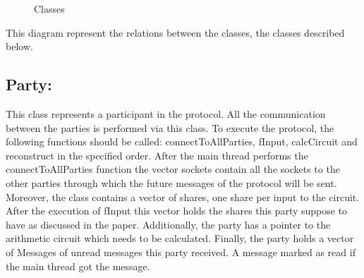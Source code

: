 \documentclass[12pt]{article}
\begin{document}
\begin{figure}[h]
  \caption{Classes}
  \label{fig:Classes}
\end{figure}

This diagram represent the relations between the classes, the classes described below.
\pagebreak
\subsection{Party:}
This class represents a participant in the protocol. All the communication between the parties is performed via this class. To execute the protocol, the following functions should be called: connectToAllParties, fInput, calcCircuit and reconstruct in the specified order.
After the main thread performs the connectToAllParties function the vector sockets contain all the sockets to the other parties through which the future messages of the protocol will be sent.
Moreover, the class contains a vector of shares, one share per input to the circuit. After the execution of fInput this vector holds the shares this party suppose to have as discussed in the paper.
Additionally, the party has a pointer to the arithmetic circuit which needs to be calculated.
Finally, the party holds a vector of Messages of unread messages this party received. A message marked as read if the main thread got the message.
\hfill\break
\end{document}
